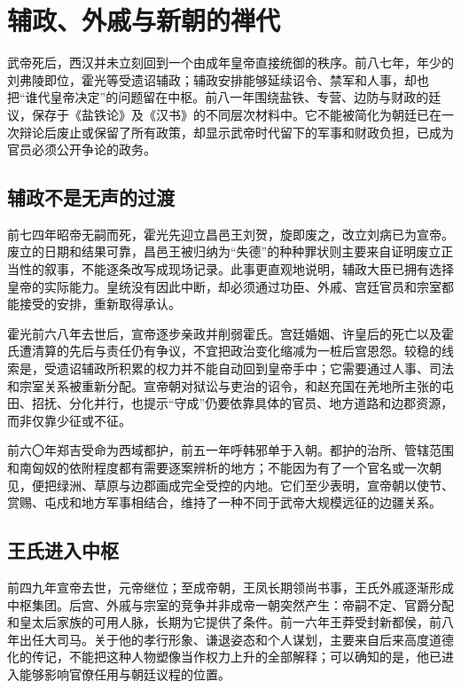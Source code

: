 \section{辅政、外戚与新朝的禅代}
\label{sec:western-han-regents-wang-mang}

武帝死后，西汉并未立刻回到一个由成年皇帝直接统御的秩序。前八七年，年少的刘弗陵即位，霍光等受遗诏辅政；辅政安排能够延续诏令、禁军和人事，却也把“谁代皇帝决定”的问题留在中枢。前八一年围绕盐铁、专营、边防与财政的廷议，保存于《盐铁论》及《汉书》的不同层次材料中。它不能被简化为朝廷已在一次辩论后废止或保留了所有政策，却显示武帝时代留下的军事和财政负担，已成为官员必须公开争论的政务。

\subsection{辅政不是无声的过渡}

前七四年昭帝无嗣而死，霍光先迎立昌邑王刘贺，旋即废之，改立刘病已为宣帝。废立的日期和结果可靠，昌邑王被归纳为“失德”的种种罪状则主要来自证明废立正当性的叙事，不能逐条改写成现场记录。此事更直观地说明，辅政大臣已拥有选择皇帝的实际能力。皇统没有因此中断，却必须通过功臣、外戚、宫廷官员和宗室都能接受的安排，重新取得承认。

霍光前六八年去世后，宣帝逐步亲政并削弱霍氏。宫廷婚姻、许皇后的死亡以及霍氏遭清算的先后与责任仍有争议，不宜把政治变化缩减为一桩后宫恩怨。较稳的线索是，受遗诏辅政所积累的权力并不能自动回到皇帝手中；它需要通过人事、司法和宗室关系被重新分配。宣帝朝对狱讼与吏治的诏令，和赵充国在羌地所主张的屯田、招抚、分化并行，也提示“守成”仍要依靠具体的官员、地方道路和边郡资源，而非仅靠少征或不征。

前六〇年郑吉受命为西域都护，前五一年呼韩邪单于入朝。都护的治所、管辖范围和南匈奴的依附程度都有需要逐案辨析的地方；不能因为有了一个官名或一次朝见，便把绿洲、草原与边郡画成完全受控的内地。它们至少表明，宣帝朝以使节、赏赐、屯戍和地方军事相结合，维持了一种不同于武帝大规模远征的边疆关系。

\subsection{王氏进入中枢}

前四九年宣帝去世，元帝继位；至成帝朝，王凤长期领尚书事，王氏外戚逐渐形成中枢集团。后宫、外戚与宗室的竞争并非成帝一朝突然产生：帝嗣不定、官爵分配和皇太后家族的可用人脉，长期为它提供了条件。前一六年王莽受封新都侯，前八年出任大司马。关于他的孝行形象、谦退姿态和个人谋划，主要来自后来高度道德化的传记，不能把这种人物塑像当作权力上升的全部解释；可以确知的是，他已进入能够影响官僚任用与朝廷议程的位置。

